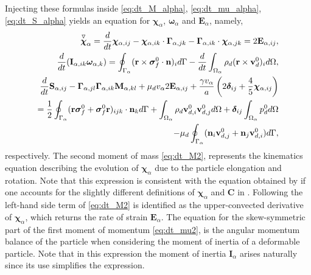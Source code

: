 Injecting these formulas inside \ref{eq:dt_M_alpha}, \ref{eq:dt_mu_alpha}, \ref{eq:dt_S_alpha} yields an equation for $\bm\chi_\alpha$, $\bm\omega_\alpha$ and $\textbf{E}_\alpha$, namely,
\begin{align}
    \overset{ \triangledown  }{\bm\chi}_\alpha
    = 
    \ddt \bm\chi_{\alpha,ij}
    -\bm\chi_{\alpha,ik} \cdot \bm\Gamma_{\alpha,jk}
    - \bm\Gamma_{\alpha,ik} \cdot \bm\chi_{\alpha,jk}
    =
    2\textbf{E}_{\alpha,ij},
    \label{eq:dt_M2}
    \\
    \ddt (\textbf{I}_{\alpha,ik}\bm\omega_{\alpha,k} )
    = 
    \intS{(\textbf{r}\times\bm\sigma_f^0\cdot \textbf{n})_i}
    - \ddt\intO{\rho_d(\textbf{r}\times \textbf{v}_d^0)_i},
    \label{eq:dt_mu2}
    \\
    \ddt \textbf{S}_{\alpha,ij}
    -  \bm\Gamma_{\alpha,jl}\bm\Gamma_{\alpha,ik} \textbf{M}_{\alpha,kl}  
    + \mu_d v_\alpha 2\textbf{E}_{\alpha,ij}
    + \frac{\gamma v_\alpha }{a} \left(
    2\bm\delta_{ij} 
    + \frac{4 }{5} \bm\chi_{\alpha,ij}
    \right) \nonumber\\
    = 
    \frac{1}{2}\intS{(\textbf{r}\bm\sigma_f^0 + \bm\sigma_f^0\textbf{r})_{ijk}\cdot \textbf{n}_k} 
    + \intO{\rho_d \textbf{v}_{d,i}^0\textbf{v}_{d,j}^0}
    + \bm\delta_{ij}\intO{p_d^0} \nonumber\\
    - \mu_d \intS{(\textbf{n}_i \textbf{v}_{d,j}^0 + \textbf{n}_j \textbf{v}_{d,i}^0)},
    \label{eq:dt_S2}
\end{align}
respectively. 
The second moment of mass \ref{eq:dt_M2}, represents the kinematics   equation describing the evolution of $\bm\chi_\alpha$ due to the particle elongation and rotation. 
Note that this expression is consistent with the equation obtained by \citet{goddard1967nonlinear} if one accounts for the slightly different definitions of $\bm\chi_\alpha$ and \textbf{C} in \citet{goddard1967nonlinear}.
Following \citet{goddard1967nonlinear} the left-hand side term of \ref{eq:dt_M2} is identified as the upper-convected derivative of $\bm\chi_\alpha$, which returns the rate of strain $\textbf{E}_\alpha$. 
The equation for the skew-symmetric part of the first moment of momentum \ref{eq:dt_mu2}, is the angular momentum balance of the particle when considering the moment of inertia of a deformable particle.
Note that in this expression the moment of inertia $\textbf{I}_\alpha$ arises naturally since its use simplifies the expression. 
